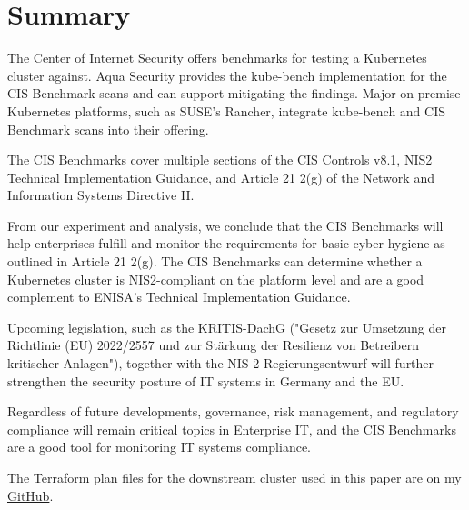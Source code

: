 %
%

\pagebreak
\section{Summary}

\onehalfspacing

The Center of Internet Security offers benchmarks for testing a Kubernetes cluster against. Aqua Security provides the kube-bench implementation for the CIS Benchmark scans and can support mitigating the findings. Major on-premise Kubernetes platforms, such as SUSE's Rancher, integrate kube-bench and CIS Benchmark scans into their offering.

The CIS Benchmarks cover multiple sections of the CIS Controls v8.1, NIS2 Technical Implementation Guidance, and Article 21 2(g) of the Network and Information Systems Directive II.

From our experiment and analysis, we conclude that the CIS Benchmarks will help enterprises fulfill and monitor the requirements for basic cyber hygiene as outlined in Article 21 2(g). The CIS Benchmarks can determine whether a Kubernetes cluster is NIS2-compliant on the platform level and are a good complement to ENISA's Technical Implementation Guidance.

Upcoming legislation, such as the KRITIS-DachG ("Gesetz zur Umsetzung der Richtlinie (EU) 2022/2557 und zur Stärkung der Resilienz von Betreibern kritischer Anlagen"), together with the NIS-2-Regierungsentwurf will further strengthen the security posture of IT systems in Germany and the EU.

Regardless of future developments, governance, risk management, and regulatory compliance will remain critical topics in Enterprise IT, and the CIS Benchmarks are a good tool for monitoring IT systems compliance.

The Terraform plan files for the downstream cluster used in this paper are on my \href{https://github.com/chfrank-cgn/Rancher}{GitHub}.
